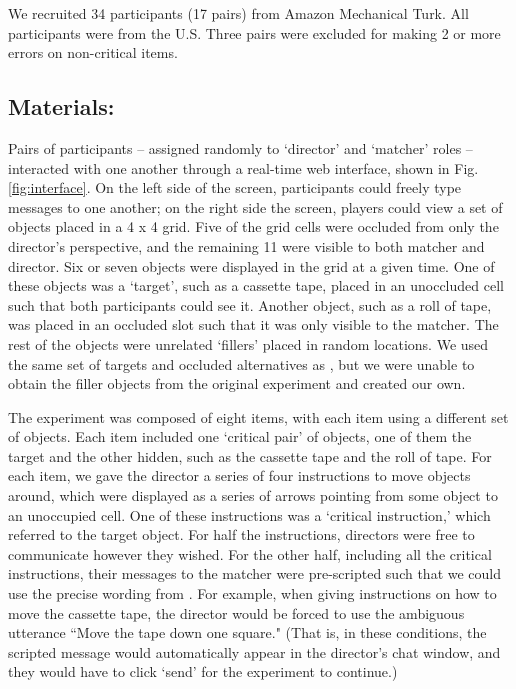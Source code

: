 \documentclass[10pt,letterpaper]{article}
\begin{document}
We recruited 34 participants (17 pairs) from Amazon Mechanical Turk. All participants were from the U.S. Three pairs were excluded for making 2 or more errors on non-critical items.

\subsection{Materials:}

Pairs of participants -- assigned randomly to `director' and `matcher' roles -- interacted with one another through a real-time web interface, shown in Fig. \ref{fig:interface}. On the left side of the screen, participants could freely type messages to one another; on the right side the screen, players could view a set of objects placed in a 4 x 4 grid. Five of the grid cells were occluded from only the director's perspective, and the remaining 11 were visible to both matcher and director. Six or seven objects were displayed in the grid at a given time. One of these objects was a `target', such as a cassette tape, placed in an unoccluded cell such that both participants could see it. Another object, such as a roll of tape, was placed in an occluded slot such that it was only visible to the matcher. The rest of the objects were unrelated `fillers' placed in random locations. We used the same set of targets and occluded alternatives as , but we were unable to obtain the filler objects from the original experiment and created our own.

The experiment was composed of eight items, with each item using a different set of objects. Each item included one `critical pair' of objects, one of them the target and the other hidden, such as the cassette tape and the roll of tape. For each item, we gave the director a series of four instructions to move objects around, which were displayed as a series of arrows pointing from some object to an unoccupied cell. One of these instructions was a `critical instruction,' which referred to the target object. For half the instructions, directors were free to communicate however they wished. For the other half, including all the critical instructions, their messages to the matcher were pre-scripted such that we could use the precise wording from . For example, when giving instructions on how to move the cassette tape, the director would be forced to use the ambiguous utterance ``Move the tape down one square." (That is, in these conditions, the scripted message would automatically appear in the director's chat window, and they would have to click `send' for the experiment to continue.)
\end{document}
